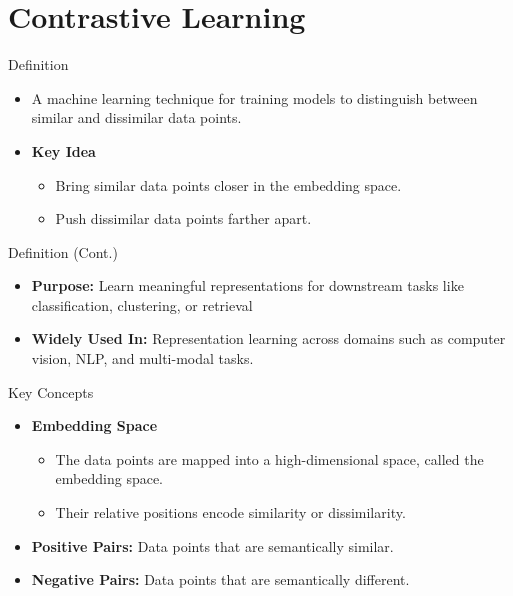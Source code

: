 \documentclass[serif, aspectratio=169]{beamer}
\begin{document}
\section{Contrastive Learning}


\begin{frame}{Definition}
    \begin{itemize}
        \item A machine learning technique for training models to distinguish between similar and dissimilar data points.

        \item \textbf{Key Idea}
        \begin{itemize}
            \item Bring similar data points closer in the embedding space.
            \item Push dissimilar data points farther apart.
        \end{itemize}
    \end{itemize}
\end{frame}


\begin{frame}{Definition (Cont.)}
    \begin{itemize}
        \item \textbf{Purpose:} Learn meaningful representations for downstream tasks like classification, clustering, or retrieval
        \item \textbf{Widely Used In:} Representation learning across domains such as computer vision, NLP, and multi-modal tasks.
    \end{itemize}
\end{frame}


\begin{frame}{Key Concepts}
    \begin{itemize}
        \item \textbf{Embedding Space}
        \begin{itemize}
            \item The data points are mapped into a high-dimensional space, called the embedding space.
            \item Their relative positions encode similarity or dissimilarity.
        \end{itemize}
        
        \item \textbf{Positive Pairs:} Data points that are semantically similar.
        \item \textbf{Negative Pairs:} Data points that are semantically different.
    \end{itemize}
\end{frame}
\end{document}
